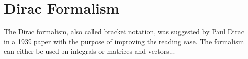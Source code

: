 \chapter{Dirac Formalism}
The Dirac formalism, also called bracket notation, was suggested by Paul Dirac in a 1939 paper with the purpose of improving the reading ease. The formalism can either be used on integrals or matrices and vectors... \cite{dirac_1939}